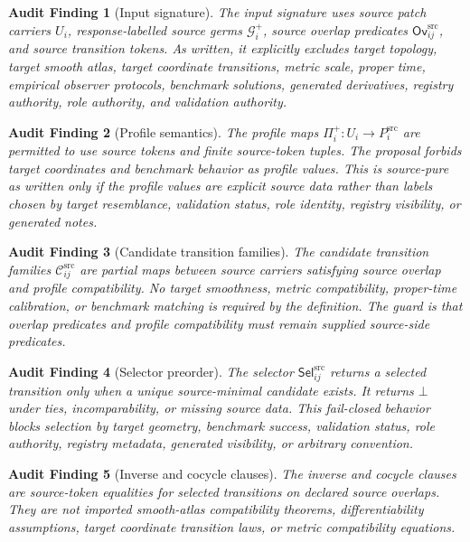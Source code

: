 \documentclass[11pt]{article}
\newcommand{\Germ}{\mathcal{G}^{+}}
\newcommand{\Ovsrc}{\mathsf{Ov}^{\mathrm{src}}}
\newcommand{\Prof}{\Pi^{+}}
\newcommand{\Cand}{\mathcal{C}^{\mathrm{src}}}
\newcommand{\Sel}{\mathsf{Sel}^{\mathrm{src}}}
\newcommand{\Bot}{\bot}
\newtheorem{audit}{Audit Finding}
\begin{document}
\begin{audit}[Input signature]
The input signature uses source patch carriers \(U_i\), response-labelled
source germs \(\Germ_i\), source overlap predicates \(\Ovsrc_{ij}\), and
source transition tokens. As written, it explicitly excludes target topology,
target smooth atlas, target coordinate transitions, metric scale, proper time,
empirical observer protocols, benchmark solutions, generated derivatives,
registry authority, role authority, and validation authority.
\end{audit}

\begin{audit}[Profile semantics]
The profile maps \(\Prof_i:U_i\to P_i^{\mathrm{src}}\) are permitted to use
source tokens and finite source-token tuples. The proposal forbids target
coordinates and benchmark behavior as profile values. This is source-pure as
written only if the profile values are explicit source data rather than labels
chosen by target resemblance, validation status, role identity, registry
visibility, or generated notes.
\end{audit}

\begin{audit}[Candidate transition families]
The candidate transition families \(\Cand_{ij}\) are partial maps between
source carriers satisfying source overlap and profile compatibility. No target
smoothness, metric compatibility, proper-time calibration, or benchmark
matching is required by the definition. The guard is that overlap predicates
and profile compatibility must remain supplied source-side predicates.
\end{audit}

\begin{audit}[Selector preorder]
The selector \(\Sel_{ij}\) returns a selected transition only when a unique
source-minimal candidate exists. It returns \(\Bot\) under ties,
incomparability, or missing source data. This fail-closed behavior blocks
selection by target geometry, benchmark success, validation status, role
authority, registry metadata, generated visibility, or arbitrary convention.
\end{audit}

\begin{audit}[Inverse and cocycle clauses]
The inverse and cocycle clauses are source-token equalities for selected
transitions on declared source overlaps. They are not imported smooth-atlas
compatibility theorems, differentiability assumptions, target coordinate
transition laws, or metric compatibility equations.
\end{audit}
\end{document}
